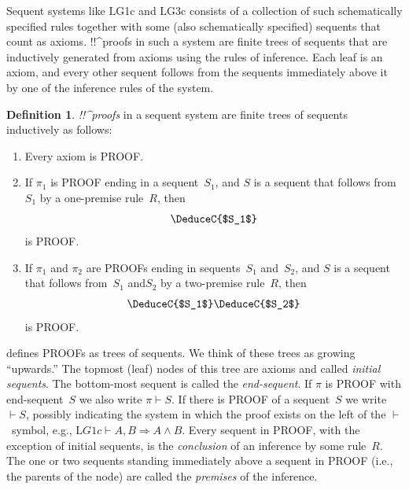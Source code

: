 \documentclass[10pt,a4paper]{article}
\newcommand*{\olup}[1]{\MakeUppercase{#1}}
\theoremstyle{plain}
\theoremstyle{definition}
\newtheorem{defn}[thm]{Definition}
\theoremstyle{remark}
\newcommand*{\ollabel}[1]{\label{#1}}
\providecommand{\AxiomC}[1]{}
\providecommand{\UnaryInfC}[1]{}
\providecommand{\BinaryInfC}[1]{}
\providecommand{\RightLabel}[1]{}
\providecommand{\DisplayProof}{}
\providecommand{\Sequent}{\mathrel{\Rightarrow}}
\providecommand{\Proves}{\mathrel{\vdash}}
\providecommand{\Log}{\ensuremath{\mathrm{L}}}
\begin{document}
Sequent systems like \Log{G1c} and \Log{G3c} consists of a collection
of such schematically specified rules together with some (also
schematically specified) sequents that count as axioms.
!!^{proof}s in such a system are finite trees of sequents that
are inductively generated from axioms using the rules of inference.
Each leaf is an axiom, and every other sequent follows from the
sequents immediately above it by one of the inference rules of the
system.

\begin{defn}\ollabel{defn:proof}
\emph{!!^{proof}s} in a sequent system are finite trees of
sequents inductively as follows:
\begin{enumerate}
  \item\ollabel{defn:prf:axiom} Every axiom is \olup{proof}.
  \item\ollabel{defn:prf:one-prem} If $\pi_1$ is \olup{proof} ending in
  a sequent~$S_1$, and $S$ is a sequent that follows from~$S_1$ by a
  one-premise rule~$R$, then
  \[
  \AxiomC{}
  \RightLabel{$\pi_1$}
  \DeduceC{$S_1$}
  \RightLabel{$R$}
  \UnaryInfC{$S$}
  \DisplayProof
  \]
  is \olup{proof}.
  \item\ollabel{defn:prf:two-prem} If $\pi_1$ and $\pi_2$ are \olup{proof}s ending in sequents~$S_1$ and~$S_2$, and $S$ is a
  sequent that follows from~$S_1$ and$S_2$ by a two-premise rule~$R$, then
  \[
  \AxiomC{}
  \RightLabel{$\pi_1$}
  \DeduceC{$S_1$}
  \AxiomC{}
  \RightLabel{$\pi_2$}
  \DeduceC{$S_2$}
  \RightLabel{$R$}
  \BinaryInfC{$S$}
  \DisplayProof
  \]
  is \olup{proof}.
\end{enumerate}
\end{defn}

 defines \olup{proof}s as trees of sequents. We think
of these trees as growing ``upwards.'' The topmost (leaf) nodes of
this tree are axioms and called \emph{initial sequents}. The
bottom-most sequent is called the \emph{end-sequent}. If $\pi$ is
\olup{proof} with end-sequent~$S$ we also write $\pi \Proves S$. If
there is \olup{proof} of a sequent~$S$ we write $\Proves S$, possibly
indicating the system in which the proof exists on the left of the
$\Proves$~symbol, e.g., $\Log{G1c} \Proves A, B \Sequent A \land
B$. Every sequent in \olup{proof}, with the exception of initial
sequents, is the \emph{conclusion} of an inference by some rule~$R$.
The one or two sequents standing immediately above a sequent in
\olup{proof} (i.e., the parents of the node) are called the
\emph{premises} of the inference.
\end{document}
